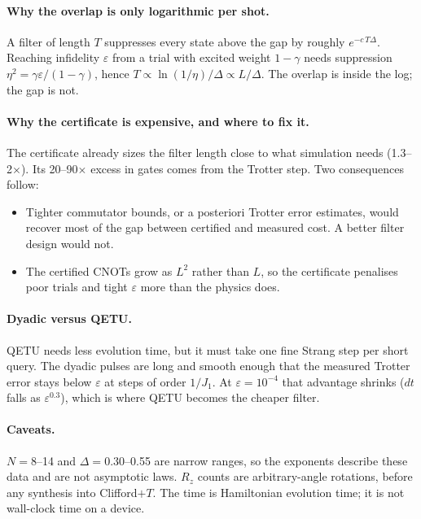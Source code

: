 \documentclass[10pt]{article}
\begin{document}
\paragraph{Why the overlap is only logarithmic per shot.} A filter of length $T$ suppresses every state above the
gap by roughly $e^{-c\,T\Delta}$. Reaching infidelity $\varepsilon$ from a trial with excited weight $1-\gamma$ needs
suppression $\eta^2=\gamma\varepsilon/(1-\gamma)$, hence $T\propto\ln(1/\eta)/\Delta\propto L/\Delta$. The overlap is
inside the log; the gap is not.

\paragraph{Why the certificate is expensive, and where to fix it.} The certificate already sizes the filter
length close to what simulation needs (1.3--2$\times$). Its 20--90$\times$ excess in gates comes from the Trotter
step. Two consequences follow:
\begin{itemize}
\item Tighter commutator bounds, or a posteriori Trotter error estimates, would recover most of the gap between
certified and measured cost. A better filter design would not.
\item The certified CNOTs grow as $L^{2}$ rather than $L$, so the certificate penalises poor trials and tight
$\varepsilon$ more than the physics does.
\end{itemize}

\paragraph{Dyadic versus QETU.} QETU needs less evolution time, but it must take one fine Strang step per short
query. The dyadic pulses are long and smooth enough that the measured Trotter error stays below $\varepsilon$
at steps of order $1/J_1$. At $\varepsilon=10^{-4}$ that advantage shrinks ($dt$ falls as $\varepsilon^{0.3}$),
which is where QETU becomes the cheaper filter.

\paragraph{Caveats.} $N=8$--14 and $\Delta=0.30$--0.55 are narrow ranges, so the exponents describe these data
and are not asymptotic laws. $R_z$ counts are arbitrary-angle rotations, before any synthesis into Clifford$+T$.
The time is Hamiltonian evolution time; it is not wall-clock time on a device.
\end{document}
